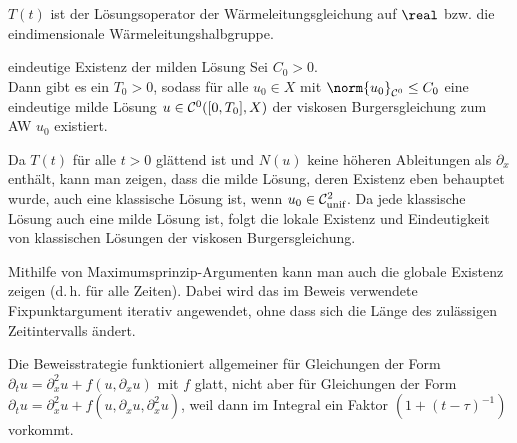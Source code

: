 \begin{Bem}
    $T(t)$ ist der Lösungsoperator der Wärmeleitungsgleichung auf $\real$ bzw.
    die eindimensionale Wärmeleitungshalbgruppe.
\end{Bem}

\linie

\begin{Satz}{eindeutige Existenz der milden Lösung}
    Sei $C_0 > 0$.\\
    Dann gibt es ein $T_0 > 0$, sodass für alle $u_0 \in X$ mit $\norm{u_0}_{\C^0} \le C_0$
    eine eindeutige milde Lösung $u \in \mathcal{C}^0([0, T_0], X)$ der viskosen
    Burgersgleichung zum AW $u_0$ existiert.
\end{Satz}

\begin{Bem}
    Da $T(t)$ für alle $t > 0$ glättend ist und $N(u)$ keine höheren Ableitungen als $\partial_x$
    enthält, kann man zeigen, dass die milde Lösung, deren Existenz eben behauptet wurde,
    auch eine klassische Lösung ist, wenn $u_0 \in \mathcal{C}^2_{\text{unif}}$.
    Da jede klassische Lösung auch eine milde Lösung ist, folgt die lokale Existenz und
    Eindeutigkeit von klassischen Lösungen der viskosen Burgersgleichung.

    Mithilfe von Maximumsprinzip-Argumenten kann man auch die globale Existenz zeigen
    (d.\,h. für alle Zeiten).
    Dabei wird das im Beweis verwendete Fixpunktargument iterativ angewendet, ohne dass sich
    die Länge des zulässigen Zeitintervalls ändert.

    Die Beweisstrategie funktioniert allgemeiner für Gleichungen der Form
    $\partial_t u = \partial_x^2 u + f(u, \partial_x u)$ mit $f$ glatt, nicht aber für Gleichungen
    der Form $\partial_t u = \partial_x^2 u + f(u, \partial_x u, \partial_x^2 u)$, weil dann im
    Integral ein Faktor $(1 + (t - \tau)^{-1})$ vorkommt.
\end{Bem}

\pagebreak
